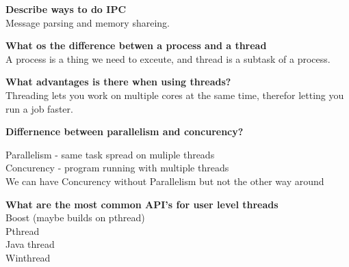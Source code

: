 \documentclass[a4paper,10pt,titlepage]{report}
\begin{document}
\vspace{5mm}
\textbf{Describe ways to do IPC\\}
\hspace{10mm}Message parsing and memory shareing. \\
\vspace{5mm}



\textbf{What os the difference betwen a process and a thread\\}
\hspace{10mm}A process is a thing we need to exceute, and thread is a subtask of a process.\\
\vspace{5mm}



\textbf{What advantages is there when using threads?\\}
\hspace{10mm}Threading lets you work on multiple cores at the same time, therefor letting you run a job faster.\\
\vspace{5mm}



\textbf{Differnence between parallelism and concurency?\\}

\hspace{10mm}	Parallelism - same task spread on muliple threads\\
\hspace{10mm}	Concurency - program running with multiple threads\\
\hspace{10mm}  	We can have Concurency without Parallelism but not the other way around\\
\vspace{5mm}



\textbf{What are the most common API's for user level threads\\}
\hspace{10mm} Boost (maybe builds on pthread) \\
\hspace{10mm} Pthread \\
\hspace{10mm} Java thread \\
\hspace{10mm} Winthread \\
\vspace{5mm}
\end{document}

